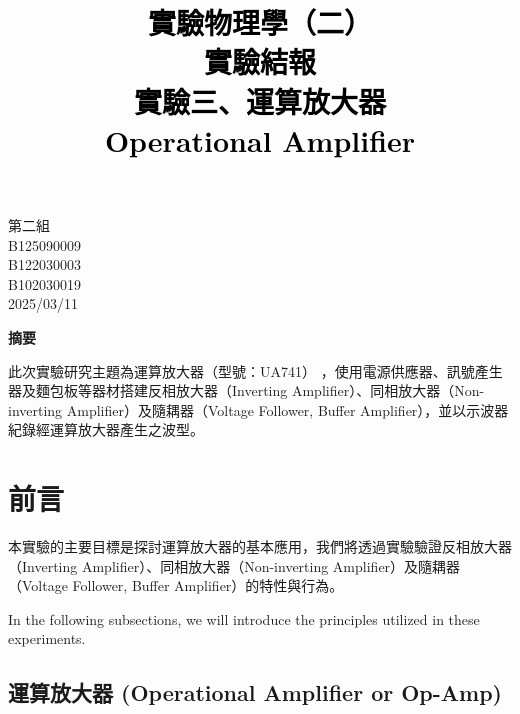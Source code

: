 \documentclass[12pt,a4paper]{article}
\title{\vspace{-0.5cm}
       {\bf \textcolor{black}{{\LARGE 
       \begin{CJK}{UTF8}{bkai}
       實驗物理學（二）\\
       \vspace{6pt}
       實驗結報\\
       \vspace{60pt}
       實驗三、運算放大器\\
       \vspace{6pt}
       Operational Amplifier
       \end{CJK}
       }}
       }
       }
\author{}
\date{}
\begin{document}
\begin{CJK}{UTF8}{bkai}

\maketitle
\thispagestyle{empty}

\vspace{10cm}
\begin{center}
{\large 第二組}\\ \vspace{12pt}
{\large {} B125090009}\\ \vspace{6pt}
{\large {}  B122030003}\\ \vspace{6pt}
{\large {} B102030019}\\ \vspace{12pt}
{\large 2025/03/11}\\
\end{center}

\clearpage

\vspace{1cm}
\begin{center}
{\large\bf\sc 摘要}
\end{center}

\noindent 

此次實驗研究主題為運算放大器（型號：UA741） ，使用電源供應器、訊號產生器及麵包板等器材搭建反相放大器（Inverting Amplifier）、同相放大器（Non-inverting Amplifier）及隨耦器（Voltage Follower, Buffer Amplifier），並以示波器紀錄經運算放大器產生之波型。 

\section{前言}
\hfill

本實驗的主要目標是探討運算放大器的基本應用，我們將透過實驗驗證反相放大器（Inverting Amplifier）、同相放大器（Non-inverting Amplifier）及隨耦器（Voltage Follower, Buffer Amplifier）的特性與行為。 

In the following subsections, we will introduce the principles utilized in these experiments.

\subsection{運算放大器 (Operational Amplifier or Op-Amp)}
\hfill


\end{CJK}
\end{document}
